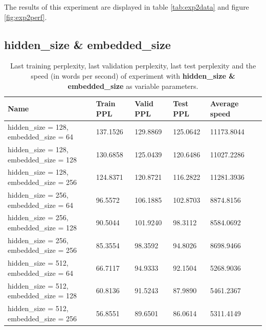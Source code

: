 \documentclass[10pt,a4paper,titlepage]{article}
\begin{document}
The results of this experiment are displayed in table \ref{tab:exp2data} and figure \ref{fig:exp2perf}.

\newpage

\subsection{hidden\_size \& embedded\_size}

\begin{table}[H]
\centering
\caption{Last training perplexity, last validation perplexity, last test perplexity and the speed (in words per second) of experiment with \textbf{hidden\_size \& embedded\_size} as variable parameters.}
\label{tab:exp3data}
\begin{tabular}{|l|l|l|l|l|l|}
\hline
{\small Name} & {\small Train PPL} & {\small Valid PPL} & {\small Test PPL} & {\small Average speed}\\ \hline
{\small hidden\_size = 128, embedded\_size = 64  }       & 137.1526   & 129.8869   & 125.0642   & 11173.8044 \\ \hline
{\small hidden\_size = 128, embedded\_size = 128}        & 130.6858   & 125.0439   & 120.6486   & 11027.2286 \\ \hline
{\small hidden\_size = 128, embedded\_size = 256}        & 124.8371   & 120.8721   & 116.2822   & 11281.3936 \\ \hline
{\small hidden\_size = 256, embedded\_size = 64}         & 96.5572    & 106.1885   & 102.8703   & 8874.8156  \\ \hline
{\small hidden\_size = 256, embedded\_size = 128}        & 90.5044    & 101.9240   & 98.3112    & 8584.0692  \\ \hline
{\small hidden\_size = 256, embedded\_size = 256}        & 85.3554    & 98.3592    & 94.8026    & 8698.9466  \\ \hline
{\small hidden\_size = 512, embedded\_size = 64}         & 66.7117    & 94.9333    & 92.1504    & 5268.9036  \\ \hline
{\small hidden\_size = 512, embedded\_size = 128}        & 60.8136    & 91.5243    & 87.9890    & 5461.2367  \\ \hline
{\small hidden\_size = 512, embedded\_size = 256}        & 56.8551    & 89.6501    & 86.0614    & 5311.4149  \\ \hline
\end{tabular}
\end{table}
\end{document}
